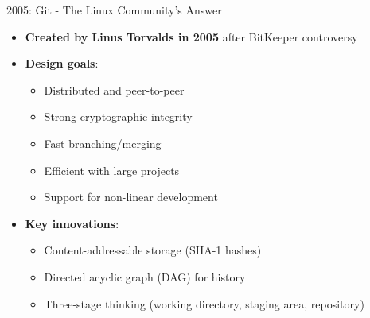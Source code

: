 \documentclass{beamer}
\begin{document}
\begin{frame}{2005: Git - The Linux Community's Answer}
\begin{itemize}
    \item \textbf{Created by Linus Torvalds in 2005} after BitKeeper controversy
    \item \textbf{Design goals}:
        \begin{itemize}
            \item Distributed and peer-to-peer
            \item Strong cryptographic integrity
            \item Fast branching/merging
            \item Efficient with large projects
            \item Support for non-linear development
        \end{itemize}
    \item \textbf{Key innovations}:
        \begin{itemize}
            \item Content-addressable storage (SHA-1 hashes)
            \item Directed acyclic graph (DAG) for history
            \item Three-stage thinking (working directory, staging area, repository)
        \end{itemize}
\end{itemize}
\end{frame}
\end{document}
